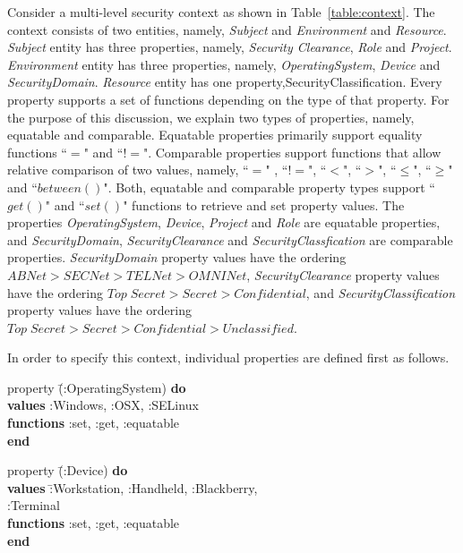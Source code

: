 Consider a multi-level security context as shown in Table~\ref{table:context}. The context consists of two entities, namely, {\em Subject} and {\em Environment} and {\em Resource}. {\em Subject} entity has three properties, namely, {\em Security Clearance}, {\em Role} and {\em Project}. {\em Environment} entity has three properties, namely, {\em OperatingSystem}, {\em Device} and {\em SecurityDomain}. {\em Resource} entity has one property,{SecurityClassification}. Every property supports a set of functions depending on the type of that property. For the purpose of this discussion, we explain two types of properties, namely, equatable and comparable. Equatable properties primarily support equality functions  ``$=$" and ``$!=$". Comparable properties support functions that allow relative comparison of two values, namely, ``$=$" , ``$!=$", ``$<$", ``$>$",  ``$\leq$", ``$\geq$" and ``$between()$". Both, equatable and comparable property types support ``$get()$" and ``$set()$" functions to retrieve and set property values. The properties {\em OperatingSystem}, {\em Device}, {\em Project} and {\em Role} are equatable properties, and {\em SecurityDomain}, {\em SecurityClearance} and {\em SecurityClassfication} are comparable properties. {\em SecurityDomain} property values have the ordering $ABNet > SECNet > TELNet > OMNINet$,  {\em SecurityClearance} property values have the ordering $Top\;Secret > Secret > Confidential$, and {\em SecurityClassification} property values have the ordering $Top\;Secret > Secret > Confidential > Unclassified$. 

In order to specify this context, individual properties are defined first as follows. 

\begin{tabbing}
             property \= (:OperatingSystem) {\bf do} \\
\>	   {\bf values}  :Windows, :OSX,  :SELinux\\
\>	   {\bf functions}   :set, :get, :equatable \\
	{\bf end} 
\end{tabbing}
	
\begin{tabbing}
 property \= (:Device) {\bf do} \\
\>	 {\bf values} \= :Workstation, :Handheld, :Blackberry, \\
\>\>      :Terminal\\
\>	 {\bf functions}  :set, :get, :equatable \\
	 {\bf end}
\end{tabbing}


